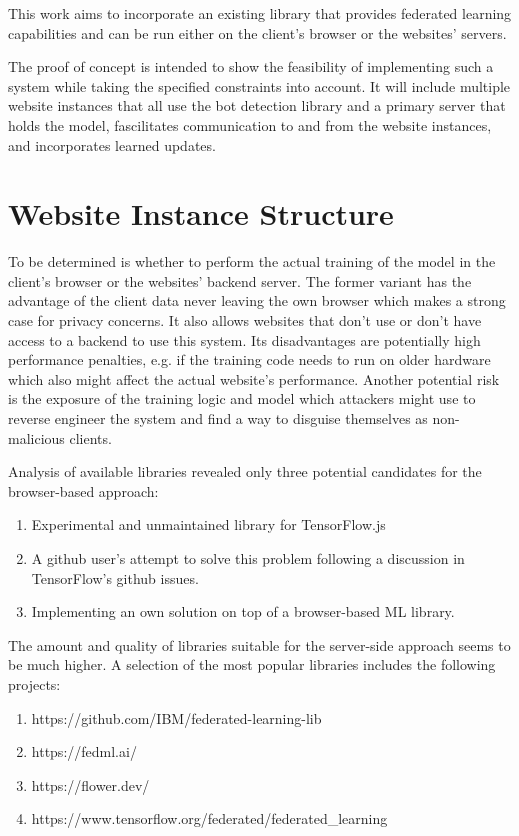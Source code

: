\documentclass[
    fontsize=12pt,
    headings=small,
    parskip=half,           %
    bibliography=totoc,
    numbers=noenddot,       %
    open=any,               %
    ]{scrreprt}
\begin{document}
This work aims to incorporate an existing library that provides federated learning capabilities and can be run either on the client's browser or the websites' servers.

The proof of concept is intended to show the feasibility of implementing such a system while taking the specified constraints into account. It will include multiple website instances that all use the bot detection library and a primary server that holds the model, fascilitates communication to and from the website instances, and incorporates learned updates.

\section{Website Instance Structure}

To be determined is whether to perform the actual training of the model in the client's browser or the websites' backend server. The former variant has the advantage of the client data never leaving the own browser which makes a strong case for privacy concerns. It also allows websites that don't use or don't have access to a backend to use this system. Its disadvantages are potentially high performance penalties, e.g. if the training code needs to run on older hardware which also might affect the actual website's performance. Another potential risk is the exposure of the training logic and model which attackers might use to reverse engineer the system and find a way to disguise themselves as non-malicious clients.

Analysis of available libraries revealed only three potential candidates for the browser-based approach:

\begin{enumerate}
	\item Experimental and unmaintained library for TensorFlow.js \cite{PAIR-federated-learning-github}
	\item A github user's attempt \cite{shashwatsahay-pyjs_federated_learning-github} to solve this problem following a discussion in TensorFlow's github issues.
	\item Implementing an own solution on top of a browser-based ML library.
\end{enumerate}

The amount and quality of libraries suitable for the server-side approach seems to be much higher. A selection of the most popular libraries includes the following projects:

\begin{enumerate}
	\item https://github.com/IBM/federated-learning-lib
	\item https://fedml.ai/
	\item https://flower.dev/
	\item https://www.tensorflow.org/federated/federated_learning
\end{enumerate}
\end{document}
